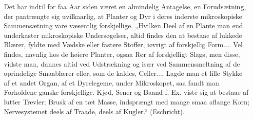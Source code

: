 \documentclass[12pt,a4paper]{book}
\begin{document}
Det har indtil for faa Aar siden været en almindelig Antagelse, en
Forudsætning, der paatrængte sig uvilkaarlig, at Planter og Dyr i deres
inderste mikroskopiske Sammensætning vare væsentlig forskjellige. „Hvilken
Deel af en Plante man end underkaster mikroskopiske Undersøgelser, altid
findes den at bestaae af lukkede Blærer, fyldte med Vædske eller fastere
Stoffer, iøvrigt af forskjellig Form.... Vel findes, navnlig hos de
høiere Planter, ogsaa Rør af forskjelligt Slags, men disse, vidste man,
dannes altid ved Udstrækning og især ved Sammensmeltning af de oprindelige
Smaablærer eller, som de kaldes, Celler.... Lagde man et lille Stykke af
et andet Organ, af et Dyrelegeme, under Mikroskopet, saa fandt man
Forholdene ganske forskjellige. Kjød, Sener og Baand f. Ex. viste sig at
bestaae af lutter Trevler; Brusk af en tæt Masse, indsprængt med mange
smaa aflange Korn; Nervesystemet deels af Traade, deels af Kugler.“
(Eschricht).
\end{document}
